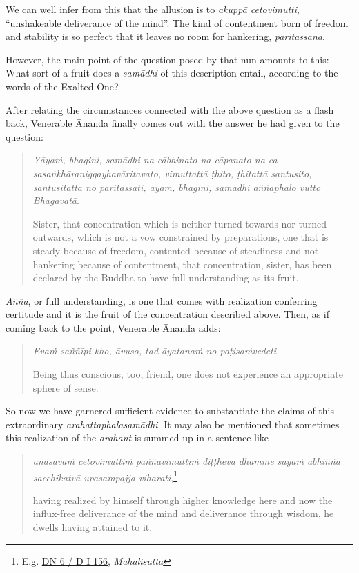 We can well infer from this that the allusion is to \emph{akuppā cetovimutti}, ``unshakeable deliverance of the mind''. The kind of contentment born of freedom and stability is so perfect that it leaves no room for hankering, \emph{paritassanā}.

However, the main point of the question posed by that nun amounts to this: What sort of a fruit does a \emph{samādhi} of this description entail, according to the words of the Exalted One?

After relating the circumstances connected with the above question as a flash back, Venerable Ānanda finally comes out with the answer he had given to the question:

\begin{quote}
\emph{Yāyaṁ, bhagini, samādhi na cābhinato na cāpanato na ca sasaṅkhāraniggayhavāritavato, vimuttattā ṭhito, ṭhitattā santusito, santusitattā no paritassati, ayaṁ, bhagini, samādhi aññāphalo vutto Bhagavatā}.

Sister, that concentration which is neither turned towards nor turned outwards, which is not a vow constrained by preparations, one that is steady because of freedom, contented because of steadiness and not hankering because of contentment, that concentration, sister, has been declared by the Buddha to have full understanding as its fruit.
\end{quote}

\emph{Aññā}, or full understanding, is one that comes with realization conferring certitude and it is the fruit of the concentration described above. Then, as if coming back to the point, Venerable Ānanda adds:

\begin{quote}
\emph{Evaṁ saññīpi kho, āvuso, tad āyatanaṁ no paṭisaṁvedeti.}

Being thus conscious, too, friend, one does not experience an appropriate sphere of sense.
\end{quote}

So now we have garnered sufficient evidence to substantiate the claims of this extraordinary \emph{arahattaphalasamādhi}. It may also be mentioned that sometimes this realization of the \emph{arahant} is summed up in a sentence like

\begin{quote}
\emph{anāsavaṁ cetovimuttiṁ paññāvimuttiṁ diṭṭheva dhamme sayaṁ abhiññā sacchikatvā upasampajja viharati},\footnote{E.g. \href{https://suttacentral.net/dn6/pli/ms}{DN 6 / D I 156}, \emph{Mahālisutta}}

having realized by himself through higher knowledge here and now the influx-free deliverance of the mind and deliverance through wisdom, he dwells having attained to it.
\end{quote}

